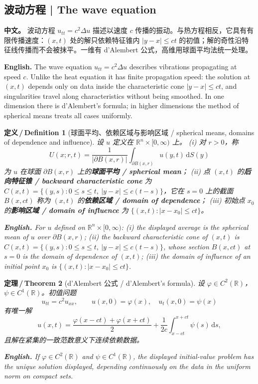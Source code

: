 \documentclass[UTF8,11pt,a4paper]{ctexart}
\newcommand{\APS}[2]{\par\noindent\textbf{中文。} #1\par\noindent\textbf{English.} #2\par\smallskip}
\newcommand{\EN}[1]{\par\noindent \textbf{English.} #1\par}
\newtheorem{definition}{定义\,/\,Definition}[section]
\newtheorem{theorem}[definition]{定理\,/\,Theorem}
\newcommand{\R}{\mathbb{R}}
\newcommand{\dd}{\mathrm{d}}
\begin{document}
\subsection{波动方程 | The wave equation}
\APS{波动方程 $u_{tt}=c^2\Delta u$ 描述以速度 $c$ 传播的振动。与热方程相反，它具有有限传播速度：$(x,t)$ 处的解只依赖特征锥内 $|y-x|\le ct$ 的初值；解的奇性沿特征线传播而不会被抹平。一维有 d'Alembert 公式，高维用球面平均法统一处理。}{The wave equation $u_{tt}=c^2\Delta u$ describes vibrations propagating at speed $c$. Unlike the heat equation it has finite propagation speed: the solution at $(x,t)$ depends only on data inside the characteristic cone $|y-x|\le ct$, and singularities travel along characteristics without being smoothed. In one dimension there is d'Alembert's formula; in higher dimensions the method of spherical means treats all cases uniformly.}

\begin{definition}[球面平均、依赖区域与影响区域 / spherical means, domains of dependence and influence]\label{def:spheremean}
设 $u$ 定义在 $\R^n\times[0,\infty)$ 上。
(i) 对 $r>0$，称
\[
U(x;r,t)=\frac{1}{|\partial B(x,r)|}\int_{\partial B(x,r)}u(y,t)\,\dd S(y)
\]
为 $u$ 在球面 $\partial B(x,r)$ 上的\textbf{球面平均 / spherical mean}；
(ii) 点 $(x,t)$ 的\textbf{后向特征锥 / backward characteristic cone} 为 $C(x,t)=\{(y,s):0\le s\le t,\ |y-x|\le c(t-s)\}$，它在 $s=0$ 上的截面 $B(x,ct)$ 称为 $(x,t)$ 的\textbf{依赖区域 / domain of dependence}；
(iii) 初始点 $x_0$ 的\textbf{影响区域 / domain of influence} 为 $\{(x,t):|x-x_0|\le ct\}$。
\EN{For $u$ defined on $\R^n\times[0,\infty)$: (i) the displayed average is the spherical mean of $u$ over $\partial B(x,r)$; (ii) the backward characteristic cone of $(x,t)$ is $C(x,t)=\{(y,s):0\le s\le t,\ |y-x|\le c(t-s)\}$, whose section $B(x,ct)$ at $s=0$ is the domain of dependence of $(x,t)$; (iii) the domain of influence of an initial point $x_0$ is $\{(x,t):|x-x_0|\le ct\}$.}
\end{definition}

\begin{theorem}[d'Alembert 公式 / d'Alembert's formula]\label{thm:dalembert}
设 $\varphi\in C^2(\R)$，$\psi\in C^1(\R)$。初值问题
\[
u_{tt}=c^2u_{xx},\qquad u(x,0)=\varphi(x),\quad u_t(x,0)=\psi(x)
\]
有唯一解
\[
u(x,t)=\frac{\varphi(x-ct)+\varphi(x+ct)}{2}+\frac{1}{2c}\int_{x-ct}^{x+ct}\psi(s)\,\dd s,
\]
且解在紧集的一致范数意义下连续依赖数据。
\EN{If $\varphi\in C^2(\R)$ and $\psi\in C^1(\R)$, the displayed initial-value problem has the unique solution displayed, depending continuously on the data in the uniform norm on compact sets.}
\end{theorem}
\end{document}
